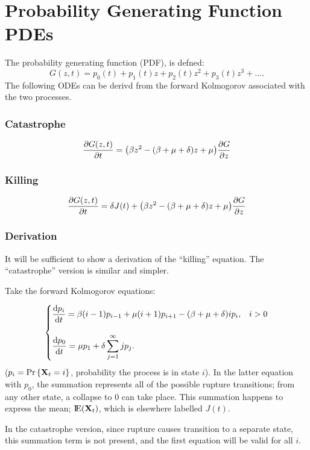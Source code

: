 \section{Probability Generating Function PDEs}
The probability generating function (PDF),  is defned:
$$G(z,t) = p_0(t) + p_1(t)z + p_2(t)z^2 + p_3(t)z^3 + \dots.$$
The following ODEs can be derivd from the forward Kolmogorov associated with the two processes.

\subsubsection*{Catastrophe}

\begin{equation}
\label{catEq1}
\displaystyle\frac{\partial G(z,t)}{\partial t} = \big(\beta z^2 - (\beta + \mu + \delta)z + \mu\big)\displaystyle\frac{\partial G}{\partial z}
\end{equation}

\subsubsection*{Killing}

\begin{equation}
\displaystyle\frac{\partial G(z,t)}{\partial t} = \delta J(t) +  \big(\beta z^2 - (\beta + \mu + \delta)z + \mu\big)\displaystyle\frac{\partial G}{\partial z}
\label{killEq1}
\end{equation}

\subsubsection*{Derivation}

It will be sufficient to show a derivation of the ``killing'' equation. The ``catastrophe'' version is similar and simpler. \par

Take the forward Kolmogorov equations: 

$$\begin{cases}
    \displaystyle\frac{{\rm d} p_i}{{\rm d} t} = \beta (i-1) p_{i-1} + \mu (i+1) p_{i+1} - (\beta + \mu + \delta)ip_i, & i > 0\\
   \\
    \displaystyle\frac{{\rm d} p_0}{{\rm d} t} = \mu p_1 +  \delta\sum^\infty_{j=1} jp_j.
\end{cases}$$
($p_i = {\text{Pr}\left\{{{\bf X}_t} = i\right\}}$, probability the process is in state $i$). In the latter equation with $p_0$, the summation represents all of the possible rupture transitions; from any other state, a collapse to 0 can take place. This summation happens to express the mean; ${\rm I}\!{\rm E}({{\bf X}_t})$, which is elsewhere labelled $J(t)$.\par 
In the catastrophe version, since rupture causes transition to a separate state, this summation term is not present, and the first equation will be valid for all $i$.\par
\vspace{10pt}

